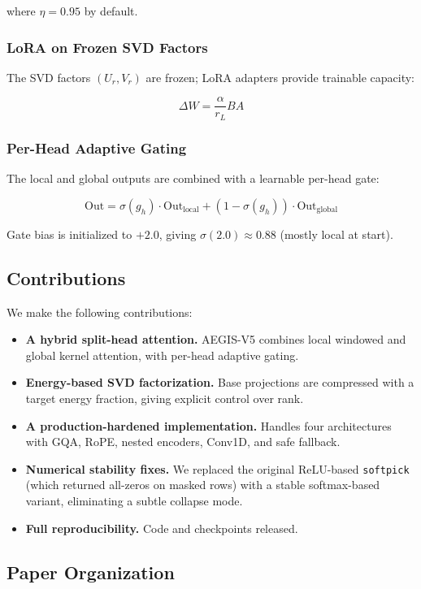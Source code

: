 where $\eta = 0.95$ by default.

\subsubsection{LoRA on Frozen SVD Factors}

The SVD factors $(U_r, V_r)$ are frozen; LoRA adapters provide trainable 
capacity:

\[
\Delta W = \frac{\alpha}{r_L} B A
\]

\subsubsection{Per-Head Adaptive Gating}

The local and global outputs are combined with a learnable per-head gate:

\[
\text{Out} = \sigma(g_h) \cdot \text{Out}_\text{local} + (1 - \sigma(g_h)) \cdot \text{Out}_\text{global}
\]

Gate bias is initialized to $+2.0$, giving $\sigma(2.0) \approx 0.88$ 
(mostly local at start).

\subsection{Contributions}

We make the following contributions:

\begin{itemize}
\item \textbf{A hybrid split-head attention.} AEGIS-V5 combines local windowed and
  global kernel attention, with per-head adaptive gating.
\item \textbf{Energy-based SVD factorization.} Base projections are compressed with
  a target energy fraction, giving explicit control over rank.
\item \textbf{A production-hardened implementation.} Handles four architectures with
  GQA, RoPE, nested encoders, Conv1D, and safe fallback.
\item \textbf{Numerical stability fixes.} We replaced the original ReLU-based \texttt{softpick}
  (which returned all-zeros on masked rows) with a stable softmax-based
  variant, eliminating a subtle collapse mode.
\item \textbf{Full reproducibility.} Code and checkpoints released.

\end{itemize}
\subsection{Paper Organization}

